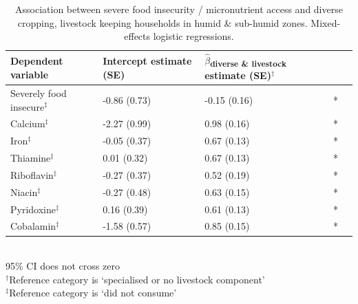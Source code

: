 \begin{table}[H]
  \captionsetup{singlelinecheck = false, justification=justified}
  \caption{
  Association between severe food insecurity / micronutrient access and diverse cropping, livestock keeping households in humid \& sub-humid zones. Mixed-effects logistic regressions.
  }
  \label{tab:C_13_2}
  \small
\begin{tabular}{L{5cm} C{2.5cm} C{2.5cm} C{2cm} C{2cm}}
\toprule
Dependent variable & Intercept estimate (SE) & $\hat{\beta}$\textsubscript{diverse \& livestock} estimate (SE)$^{\dag}$ &  \\
\midrule
Severely food insecure$^{\ddag}$ & -0.86 (0.73) & -0.15 (0.16) & * \\
Calcium$^{\ddag}$ & -2.27 (0.99) & 0.98 (0.16) & * \\
Iron$^{\ddag}$ & -0.05 (0.37) & 0.67 (0.13) & * \\
Thiamine$^{\ddag}$ & 0.01 (0.32) & 0.67 (0.13) & * \\
Riboflavin$^{\ddag}$ & -0.27 (0.37) & 0.52 (0.19) & * \\
Niacin$^{\ddag}$ & -0.27 (0.48) & 0.63 (0.15) & * \\
Pyridoxine$^{\ddag}$ & 0.16 (0.39) & 0.61 (0.13) & * \\
Cobalamin$^{\ddag}$ & -1.58 (0.57) & 0.85 (0.15) & * \\
\bottomrule
\end{tabular}
\footnotesize
\raggedright
\\
95\% CI does not cross zero \\
$^{\dag}$Reference category is `specialised or no livestock component' \\
$^{\ddag}$Reference category is `did not consume'
\end{table}

